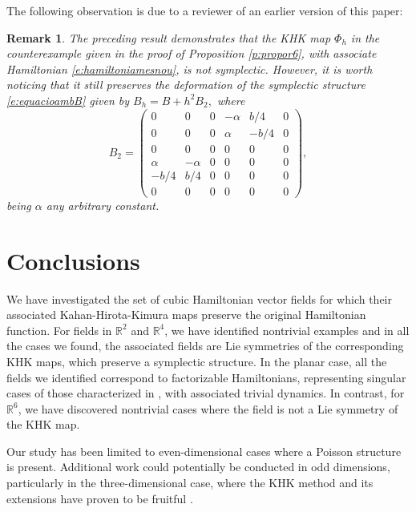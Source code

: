 \documentclass[11pt]{article}
\newtheorem {remark} [theorem]{Remark}
\begin{document}
The following observation is due to a reviewer of an earlier version of this paper:  


\begin{remark}\label{r:referee2}  
The preceding result demonstrates that the KHK map $\Phi_h$ in the counterexample given in the proof of Proposition \ref{p:propor6}, with associate Hamiltonian \eqref{e:hamiltoniamesnou}, is not symplectic. However, it 
is worth noticing that it still preserves the deformation of the symplectic structure \eqref{e:equacioambB} given by
$ B_h= B + h^2 B_2,$  
where  
$$ 
B_2 = \left(\begin{array}{cccccc}
0 &0&0 &-\alpha &{b}/{4} & 0\\
0 &0&0 &\alpha &-{b}/{4} & 0\\
0 &0&0 & 0 & 0 & 0\\
\alpha &-\alpha&0 & 0 & 0 & 0\\
-b/4 &b/4&0 & 0 & 0 & 0\\
0 &0&0 & 0 & 0 & 0
\end{array} \right),
$$being $\alpha$ any arbitrary constant.
  

\end{remark}  



\section{Conclusions}


We have investigated the set of cubic Hamiltonian vector fields for which their associated Kahan-Hirota-Kimura  maps preserve the original Hamiltonian function. For fields in $\mathbb{R}^2$ and $\mathbb{R}^4$, we have identified nontrivial examples and in all the cases we found, the associated fields are Lie symmetries of the corresponding 
KHK maps, which preserve a symplectic structure. In the planar case, all the fields we identified correspond to factorizable Hamiltonians, representing singular cases of those characterized in \cite{GMQ24}, with associated trivial dynamics.  
In contrast, for $\mathbb{R}^6$, we have discovered nontrivial cases where the field is not a Lie symmetry of the KHK map.  

Our study has been limited to even-dimensional cases where a Poisson structure is present. Additional work could potentially be conducted in odd dimensions,  particularly in the three-dimensional case, where the KHK method and its extensions have proven to be fruitful \cite{ASW,GG23,PS10}.  
\end{document}
